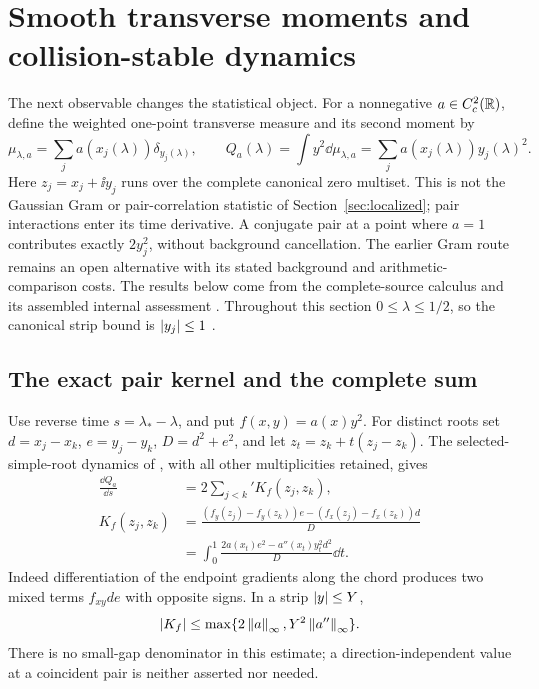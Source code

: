 \section{Smooth transverse moments and collision-stable dynamics}
\label{sec:smooth-transverse}

The next observable changes the statistical object. For a nonnegative
\(a\in C_c^2(\mathbb R)\), define the weighted one-point transverse measure
and its second moment by
\begin{equation}\label{eq:transverse-measure}
 \mu_{\lambda,a}=\sum_j a(x_j(\lambda))\delta_{y_j(\lambda)},
 \qquad Q_a(\lambda)=\int y^2\dd\mu_{\lambda,a}
                  =\sum_j a(x_j(\lambda))y_j(\lambda)^2.
\end{equation}
Here \(z_j=x_j+\ii y_j\) runs over the complete canonical zero multiset.
This is not the Gaussian Gram or pair-correlation statistic of
Section~\ref{sec:localized}; pair interactions enter its time derivative.
A conjugate pair at a point where \(a=1\) contributes exactly \(2y_j^2\),
without background cancellation. The earlier Gram route remains an open
alternative with its stated background and arithmetic-comparison costs.
The results below come from the complete-source calculus and its
assembled internal assessment \cite{SmoothLocalizationProof,SmoothLocalizationAssessment}.
Throughout this section \(0\le\lambda\le1/2\), so the canonical strip
bound is \(\left|y_j\right|\le1\) \cite[Theorem 3.2]{Polymath2019}.

\subsection{The exact pair kernel and the complete sum}
Use reverse time \(s=\lambda_*-\lambda\), and put \(f(x,y)=a(x)y^2\).
For distinct roots set \(d=x_j-x_k\), \(e=y_j-y_k\), \(D=d^2+e^2\),
and let \(z_t=z_k+t(z_j-z_k)\). The selected-simple-root dynamics
of \cite[Proposition 3.1]{Polymath2019}, with all other multiplicities
retained, gives
\begin{align}
 \frac{\dd Q_a}{\dd s}&=2\sum_{j<k}'K_f(z_j,z_k),
       \label{eq:full-transverse-kernel}\\
 K_f(z_j,z_k)
 &=\frac{(f_y(z_j)-f_y(z_k))e-(f_x(z_j)-f_x(z_k))d}{D}\nonumber\\
 &=\int_0^1\frac{2a(x_t)e^2-a''(x_t)y_t^2d^2}{D}\dd t.
       \label{eq:transverse-chord}
\end{align}
Indeed differentiation of the endpoint gradients along the chord
produces two mixed terms \(f_{xy}de\) with opposite signs. In a strip
\(\left|y\right|\le Y\),
\begin{equation}\label{eq:gap-free-kernel}
 \left|K_f\right|\le\max\{2\left\lVert a\right\rVert_\infty,Y^2\left\lVert a''\right\rVert_\infty\}.
\end{equation}
There is no small-gap denominator in this estimate; a direction-independent
value at a coincident pair is neither asserted nor needed.


